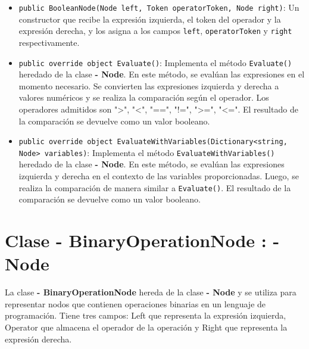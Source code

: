 \documentclass{article}
\newcommand{\subclassed}[1]{\textcolor{classcolor}{\textbf{- #1}}}
\begin{document}
\begin{itemize}
    \item \lstinline{public BooleanNode(Node left, Token operatorToken, Node right)}: Un constructor que recibe la expresión izquierda, el token del operador y la expresión derecha, y los asigna a los campos \lstinline{left}, \lstinline{operatorToken} y \lstinline{right} respectivamente.

    \item \lstinline{public override object Evaluate()}: Implementa el método \lstinline{Evaluate()} heredado de la clase \subclassed{Node}. En este método, se evalúan las expresiones en el momento necesario. Se convierten las expresiones izquierda y derecha a valores numéricos y se realiza la comparación según el operador. Los operadores admitidos son ">", "<", "==", "!=", ">=", "<=". El resultado de la comparación se devuelve como un valor booleano.

    \item \lstinline{public override object EvaluateWithVariables(Dictionary<string, Node> variables)}: Implementa el método \lstinline{EvaluateWithVariables()} heredado de la clase \subclassed{Node}. En este método, se evalúan las expresiones izquierda y derecha en el contexto de las variables proporcionadas. Luego, se realiza la comparación de manera similar a \lstinline{Evaluate()}. El resultado de la comparación se devuelve como un valor booleano.

\end{itemize}
\section{Clase \subclassed{BinaryOperationNode} : \subclassed{Node}}

La clase \subclassed{BinaryOperationNode} hereda de la clase \subclassed{Node} y se utiliza para representar nodos que contienen operaciones binarias en un lenguaje de programación. Tiene tres campos: \textcolor{fieldcolor}{Left} que representa la expresión izquierda, \textcolor{fieldcolor}{Operator} que almacena el operador de la operación y \textcolor{fieldcolor}{Right} que representa la expresión derecha.
\end{document}
